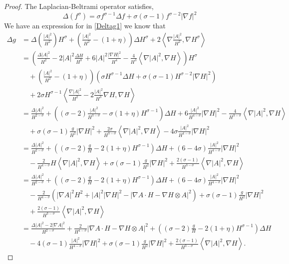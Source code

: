 \begin{proof}
    The Laplacian-Beltrami operator satisfies, 
    \[ \Delta(f^{\sigma}) = \sigma f^{\sigma-1}\Delta f + \sigma(\sigma-1)f^{\sigma -2}|\nabla f|^{2} \]
    We have an expression for in \cref{Deltag1} we know that \begin{align*}
        \Delta g & = \Delta  \left(\frac{|A|^{2}}{H^{2}} \right)H^{\sigma} + \left( \frac{|A|^{2}}{H^{2}} - (1+\eta) \right)\Delta H^{\sigma} + 2\left<  \nabla  \frac{|A|^{2}}{H^{2}} , \nabla H^{\sigma} \right> \\
        & = \left( \frac{\Delta |A|^{2}}{{H^{2}}} - 2|A|^{2} \frac{\Delta H}{H^{3}} + 6|A|^{2} \frac{| \nabla H|^{2}}{H^{4}} - \frac{4}{H^{3}}\left< \nabla |A|^{2}, \nabla H \right> \right)H^{\sigma} \\
        & \quad + \left( \frac{|A|^{2}}{H^{2}} - (1+\eta) \right)\left( \sigma H^{\sigma-1}\Delta H + \sigma (\sigma -1)H^{\sigma -2}|\nabla H|^{2} \right) \\
        & \quad + 2\sigma H^{\sigma-1}\left< \frac{\nabla|A|^{2}}{H^{2}} -2 \frac{|A|^{2}}{H^{3}} \nabla H , \nabla H\right> \\
        & =  \frac{\Delta |A|^{2}}{H^{2-\sigma}} + \left( (\sigma-2) \frac{|A|^{2}}{H^{3-\sigma}} - \sigma(1+\eta)H^{\sigma-1} \right)\Delta H + 6 \frac{|A|^{2}}{H^{4-\sigma}}|\nabla H|^{2} - \frac{4}{H^{3-\sigma}}\left< \nabla |A|^{2}, \nabla H \right>  \\
        & \quad + \sigma(\sigma -1)\frac{g}{H^{2}}|\nabla H|^{2} + \frac{2 \sigma}{H^{3-\sigma}} \left< \nabla |A|^{2}, \nabla H \right> - 4\sigma \frac{|A|^{2}}{H^{4-\sigma}}|\nabla H|^{2} \\
        & =  \frac{\Delta |A|^{2}}{H^{2-\sigma}} + \left( (\sigma-2)\frac{g}{H} - 2(1+\eta)H^{\sigma-1} \right)\Delta H + \left( 6-4 \sigma \right)\frac{|A|^{2}}{H^{4-\sigma}}|\nabla H|^{2}  \\
        & \quad - \frac{2}{H^{4-\sigma}}H\left< \nabla |A|^{2}, \nabla H \right> + \sigma(\sigma -1)\frac{g}{H^{2}}|\nabla H|^{2} + \frac{2(\sigma -1)}{H^{3-\sigma}} \left< \nabla |A|^{2}, \nabla H \right> \\
        & = \frac{\Delta |A|^{2}}{H^{2-\sigma}} + \left( (\sigma-2)\frac{g}{H} - 2(1+\eta)H^{\sigma-1} \right)\Delta H + \left( 6-4 \sigma \right)\frac{|A|^{2}}{H^{4-\sigma}}|\nabla H|^{2}  \\
        & \quad - \frac{2}{H^{4-\sigma}}\left( |\nabla A|^{2}H^{2} + |A|^{2}|\nabla H|^{2}-|\nabla A \cdot H - \nabla H \otimes A|^{2} \right) + \sigma(\sigma -1)\frac{g}{H^{2}}|\nabla H|^{2} \\
        & \quad + \frac{2(\sigma -1)}{H^{3-\sigma}} \left< \nabla |A|^{2}, \nabla H \right>  \\
        & = \frac{\Delta |A|^{2}- 2|\nabla A|^{2}}{H^{2-\sigma}} + \frac{2}{H^{4-\sigma}}| \nabla A \cdot H - \nabla H \otimes A|^{2} + \left( (\sigma-2)\frac{g}{H} - 2(1+\eta)H^{\sigma-1} \right)\Delta H \\
        & \quad - 4(\sigma -1) \frac{|A|^{2}}{H^{4-\sigma}} |\nabla H|^{2} + \sigma(\sigma -1)\frac{g}{H^{2}}|\nabla H|^{2}+ \frac{2(\sigma -1)}{H^{3-\sigma}} \left< \nabla |A|^{2}, \nabla H \right>.
    \end{align*}


\end{proof}

